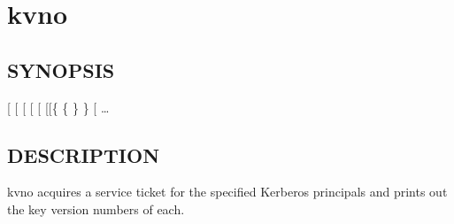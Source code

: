 \documentclass[letterpaper,10pt,english]{sphinxmanual}
\begin{document}
\section{kvno}
\label{\detokenize{user/user_commands/kvno:kvno-1}}\label{\detokenize{user/user_commands/kvno::doc}}\label{\detokenize{user/user_commands/kvno:kvno}}

\subsection{SYNOPSIS}
\label{\detokenize{user/user_commands/kvno:synopsis}}
{[} \sphinxstyleemphasis{ccache}{]}
{[} \sphinxstyleemphasis{etype}{]}
{[}\sphinxstylestrong{-q}{]}
{[} \textbar{}  \sphinxstyleemphasis{sname}{]}
{[}\sphinxstylestrong{-P}{]}
{[}{[}\{  \textbar{} \{ \textbar{} \} \} {[}\sphinxstylestrong{-P}{]}{]} \textbar{}  \sphinxstyleemphasis{ccache}{]}
 …


\subsection{DESCRIPTION}
\label{\detokenize{user/user_commands/kvno:description}}
kvno acquires a service ticket for the specified Kerberos principals
and prints out the key version numbers of each.
\end{document}

